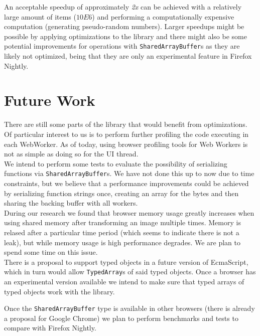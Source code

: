 \documentclass[runningheads,a4paper]{llncs}
\begin{document}
An acceptable speedup of approximately \emph{2x} can be achieved with a relatively large amount of items (\(10E6\)) and performing a computationally expensive computation (generating pseudo-random numbers). Larger speedups might be possible by applying optimizations to the library and there might also be some potential improvements for operations with \verb+SharedArrayBuffer+s as they are likely not optimized, being that they are only an experimental feature in Firefox Nightly.

\section{Future Work}
There are still some parts of the library that would benefit from optimizations. Of particular interest to us is to perform further profiling the code executing in each WebWorker. As of today, using browser profiling tools for Web Workers is not as simple as doing so for the UI thread.\\

We intend to perform some tests to evaluate the possibility of serializing functions via \verb+SharedArrayBuffer+s. We have not done this up to now due to time constraints, but we believe that a performance improvements could be achieved by serializing function strings once, creating an array for the bytes and then sharing the backing buffer with all workers.\\

During our research we found that browser memory usage greatly increases when using shared memory after transforming an image multiple times. Memory is relased after a particular time period (which seems to indicate there is not a leak), but while memory usage is high performance degrades. We are plan to spend some time on this issue.\\

There is a proposal to support typed objects in a future version of EcmaScript, which in turn would allow \verb+TypedArray+s of said typed objects. Once a browser has an experimental version available we intend to make sure that typed arrays of typed objects work with the library.

Once the \verb+SharedArrayBuffer+ type is available in other browsers (there is already a proposal for Google Chrome) we plan to perform benchmarks and tests to compare with Firefox Nightly.
\end{document}
